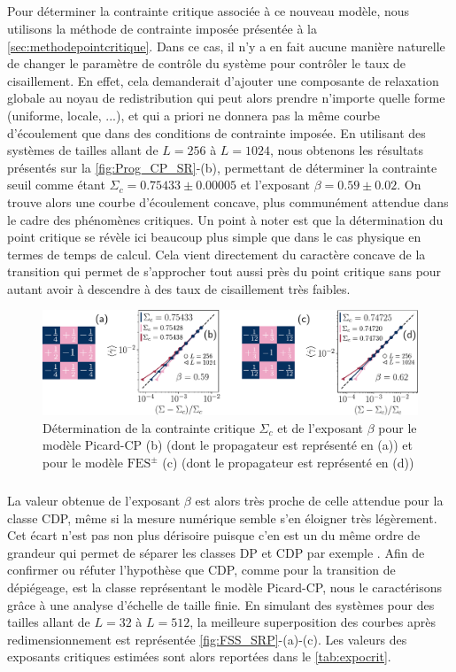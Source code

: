 \subparagraph{}Pour déterminer la contrainte critique associée à ce nouveau modèle, nous utilisons la méthode de contrainte imposée présentée à la \autoref{sec:methodepointcritique}. Dans ce cas, il n'y a en fait aucune manière naturelle de changer le paramètre de contrôle du système pour contrôler le taux de cisaillement. En effet, cela demanderait d'ajouter une composante de relaxation globale au noyau de redistribution qui peut alors prendre n'importe quelle forme (uniforme, locale, ...), et qui a priori ne donnera pas la même courbe d'écoulement que dans des conditions de contrainte imposée. En utilisant des systèmes de tailles allant de $L=256$ à $L=1024$, nous obtenons les résultats présentés sur la \autoref{fig:Prog_CP_SR}-(b), permettant de déterminer la contrainte seuil comme étant $\Sigma_c = 0.75433 \pm 0.00005$ et l'exposant $\beta = 0.59 \pm 0.02$. On trouve alors une courbe d'écoulement concave, plus communément attendue dans le cadre des phénomènes critiques. Un point à noter est que la détermination du point critique se révèle ici beaucoup plus simple que dans le cas physique en termes de temps de calcul. Cela vient directement du caractère concave de la transition qui permet de s'approcher tout aussi près du point critique sans pour autant avoir à descendre à des taux de cisaillement très faibles.

\begin{figure}[h]
	\centering
	\includegraphics[width=\textwidth]{Chapitre4/Figures/CourtePortee/Prog_CP.pdf}
	\caption{Détermination de la contrainte critique $\Sigma_c$ et de l'exposant $\beta$ pour le modèle Picard-CP (b) (dont le propagateur est représenté en (a)) et pour le modèle $\text{FES}^\pm$ (c) (dont le propagateur est représenté en (d))}
	\label{fig:Prog_CP_SR}
\end{figure}

\subparagraph{}La valeur obtenue de l'exposant $\beta$ est alors très proche de celle attendue pour la classe CDP, même si la mesure numérique semble s'en éloigner très légèrement. Cet écart n'est pas non plus dérisoire puisque c'en est un du même ordre de grandeur qui permet de séparer les classes DP et CDP par exemple \cite{lubeck_universal_2004}. Afin de confirmer ou réfuter l'hypothèse que CDP, comme pour la transition de dépiégeage, est la classe représentant le modèle Picard-CP, nous le caractérisons grâce à une analyse d'échelle de taille finie. En simulant des systèmes pour des tailles allant de $L=32$ à $L=512$, la meilleure superposition des courbes après redimensionnement est représentée \autoref{fig:FSS_SRP}-(a)-(c). Les valeurs des exposants critiques estimées sont alors reportées dans le \autoref{tab:expocrit}.

